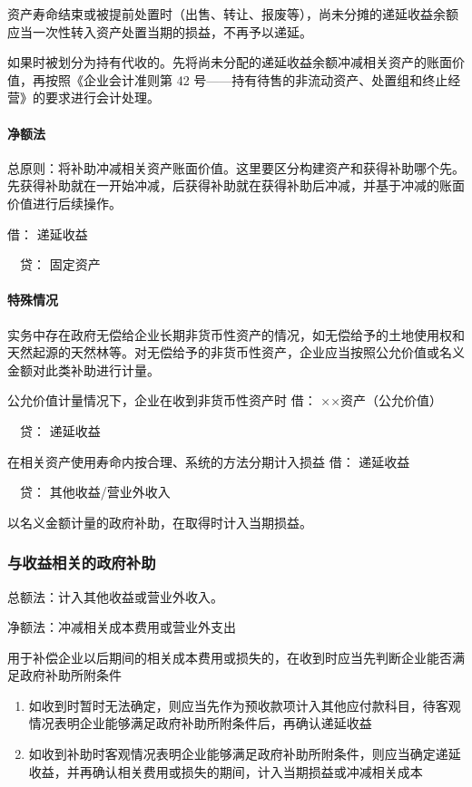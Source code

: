 \documentclass[UTF8,12pt]{ctexart}
\newenvironment{Dr}{\noindent 借：}{\par}
\newenvironment{Cr}{\noindent \ \ 贷：}{\par}
\numberwithin{equation}{section} %
\numberwithin{figure}{section}
\numberwithin{table}{section}
\begin{document}
	资产寿命结束或被提前处置时（出售、转让、报废等），尚未分摊的递延收益余额应当一次性转入资产处置当期的损益，不再予以递延。
	
	如果时被划分为持有代收的。先将尚未分配的递延收益余额冲减相关资产的账面价值，再按照《企业会计准则第 42 号——持有待售的非流动资产、处置组和终止经营》的要求进行会计处理。
	
	
	\paragraph{净额法}
	总原则：将补助冲减相关资产账面价值。这里要区分构建资产和获得补助哪个先。先获得补助就在一开始冲减，后获得补助就在获得补助后冲减，并基于冲减的账面价值进行后续操作。
	
	\begin{Dr}
		递延收益
	\end{Dr}
	\begin{Cr}
		固定资产
	\end{Cr}
	
	
	\paragraph{特殊情况}
	实务中存在政府无偿给企业长期非货币性资产的情况，如无偿给予的土地使用权和天然起源的天然林等。对无偿给予的非货币性资产，企业应当按照公允价值或名义金额对此类补助进行计量。
	
	公允价值计量情况下，企业在收到非货币性资产时
	\begin{Dr}
		××资产（公允价值）
	\end{Dr}
	\begin{Cr}
		递延收益
	\end{Cr}
	
	在相关资产使用寿命内按合理、系统的方法分期计入损益
	\begin{Dr}
		递延收益
	\end{Dr}
	\begin{Cr}
		其他收益/营业外收入
	\end{Cr}

	
	以名义金额计量的政府补助，在取得时计入当期损益。
	
	\subsubsection{与收益相关的政府补助}
	总额法：计入其他收益或营业外收入。
	
	净额法：冲减相关成本费用或营业外支出
	
	用于补偿企业以后期间的相关成本费用或损失的，在收到时应当先判断企业能否满足政府补助所附条件
	\begin{enumerate}
		\item 如收到时暂时无法确定，则应当先作为预收款项计入其他应付款科目，待客观情况表明企业能够满足政府补助所附条件后，再确认递延收益
		
		\item 如收到补助时客观情况表明企业能够满足政府补助所附条件，则应当确定递延收益，并再确认相关费用或损失的期间，计入当期损益或冲减相关成本
		
	\end{enumerate}
	
\end{document}
